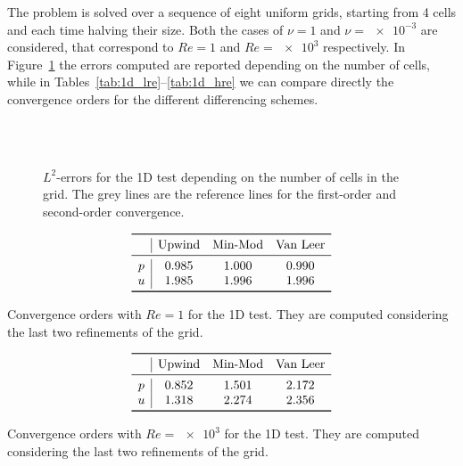 The problem is solved over a sequence of eight uniform grids, starting from 
4 cells and each time halving their size. Both the cases of $\nu=1$ 
and $\nu=\num{e-3}$ are considered, that correspond to $Re=1$ and $Re=\num{e3}$ 
respectively. In Figure~\ref{fig:1d_err} the errors computed are reported 
depending on the number of cells, while in 
Tables~\ref{tab:1d_lre}--\ref{tab:1d_hre} we can compare directly the 
convergence orders for the different differencing schemes.
\begin{figure}
	\centering
	\subfloat[Upwind, $Re = 1$]{
		}
	\subfloat[Upwind, $Re = \num{e3}$]{
		}\\
	\subfloat[Min-Mod, $Re = 1$]{
		}
	\subfloat[Min-Mod, $Re = \num{e3}$]{
		}\\
	\subfloat[Van Leer, $Re = 1$]{
		}
	\subfloat[Van Leer, $Re = \num{e3}$]{
		}
	\caption[$L^2$-errors for the 1D test]{$L^2$-errors for the 1D test 
	depending on the number of cells in the grid. The grey lines are the 
	reference lines for the first-order and second-order convergence.}
	\label{fig:1d_err}
\end{figure}
\begin{table}
	\centering
	\[
	\begin{array}{c|ccc}
	\toprule
	& \text{Upwind} & \text{Min-Mod} & \text{Van Leer} \\ 
	\midrule
	p & 0.985 & 1.000 & 0.990\\
	u & 1.985 & 1.996 & 1.996\\
	\bottomrule
	\end{array}
	\]
	\caption[Convergence orders with $Re = 1$ for the 1D test]{Convergence 
	orders with $Re = 1$ for the 1D test. They are computed considering the 
	last two refinements of the grid.}
	\label{tab:1d_lre}
	\[
	\begin{array}{c|ccc}
	\toprule
	& \text{Upwind} & \text{Min-Mod} & \text{Van Leer} \\ 
	\midrule
	p & 0.852 & 1.501 & 2.172\\
	u & 1.318 & 2.274 & 2.356\\
	\bottomrule
	\end{array}
	\]
	\caption[Convergence orders with $Re = \num{e3}$ for the 1D 
	test]{Convergence orders with $Re = \num{e3}$ for the 1D test. They 
	are computed considering the last two refinements of the grid.}
	\label{tab:1d_hre}
\end{table}

